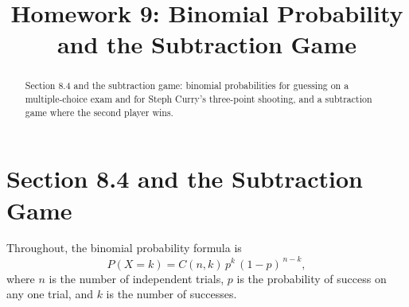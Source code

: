\documentclass[12pt]{ximera}
\title{Homework 9: Binomial Probability and the Subtraction Game}
\begin{document}
\begin{abstract}
Section 8.4 and the subtraction game: binomial probabilities for guessing on a
multiple-choice exam and for Steph Curry's three-point shooting, and a subtraction game
where the second player wins.
\end{abstract}
\maketitle

\section*{Section 8.4 and the Subtraction Game}

Throughout, the binomial probability formula is
\[
P(X=k) = C(n,k)\, p^k\, (1-p)^{\,n-k},
\]
where $n$ is the number of independent trials, $p$ is the probability of success on
any one trial, and $k$ is the number of successes.
\end{document}
